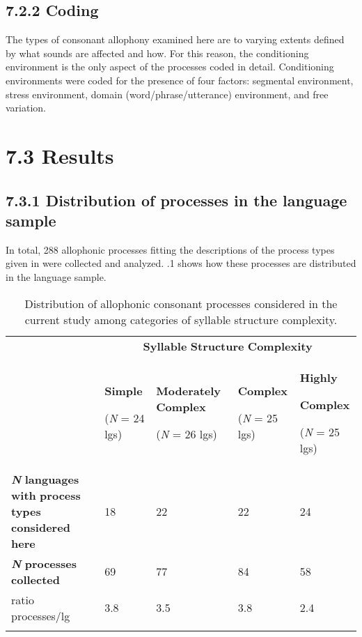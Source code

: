 \subsection{7.2.2 Coding}

  The types of consonant allophony examined here are to varying extents defined by what sounds are affected and how. For this reason, the conditioning environment is the only aspect of the processes coded in detail. Conditioning environments were coded for the presence of four factors: segmental environment, stress environment, domain (word/phrase/utterance) environment, and free variation.


\section{7.3 Results}
\subsection{7.3.1 Distribution of processes in the language sample}

  In total, 288 allophonic processes fitting the descriptions of the process types given in  were collected and analyzed. .1 shows how these processes are distributed in the language sample. 






\begin{table}
\begin{tabularx}{\textwidth}{XXXXX}
\lsptoprule
 & \multicolumn{4}{c}{ \textbf{Syllable} \textbf{Structure} \textbf{Complexity}}\\
& { \textbf{Simple}}

 (\textit{N} = 24 lgs) & { \textbf{Moderately} \textbf{Complex}}

 (\textit{N} = 26 lgs) & { \textbf{Complex}}

 (\textit{N} = 25 lgs) & { \textbf{Highly} }

{ \textbf{Complex}}

 (\textit{N} = 25 lgs)\\
 \textbf{\textit{N} }\textbf{languages} \textbf{with} \textbf{process} \textbf{types} \textbf{considered} \textbf{here} & 18 & 22 & 22 & 24\\
 \textbf{\textit{N}} \textbf{processes} \textbf{collected} & 69 & 77 & 84 & 58\\
 ratio processes/lg & 3.8 & 3.5 & 3.8 & 2.4\\
\lspbottomrule
\end{tabularx}
\caption{\label{7.1}Distribution of allophonic consonant processes considered in the current study among categories of syllable structure complexity.}
\end{table}




